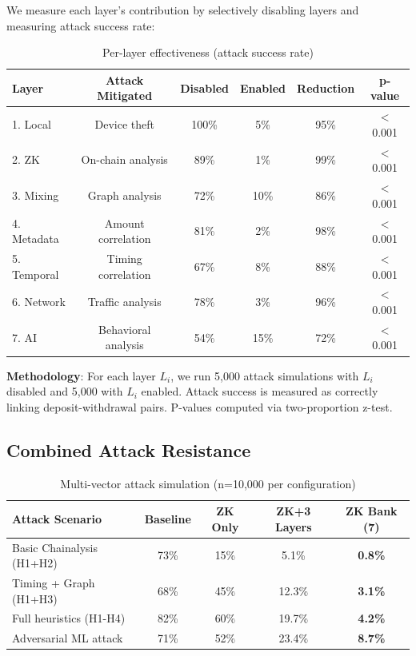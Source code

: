 \documentclass[11pt]{article}
\theoremstyle{definition}
\theoremstyle{plain}
\theoremstyle{remark}
\begin{document}
We measure each layer's contribution by selectively disabling layers and measuring attack success rate:

\begin{table}[H]
\centering
\caption{Per-layer effectiveness (attack success rate)}
\label{tab:layers}
\begin{tabular}{lccccc}
\toprule
\textbf{Layer} & \textbf{Attack Mitigated} & \textbf{Disabled} & \textbf{Enabled} & \textbf{Reduction} & \textbf{p-value} \\
\midrule
1. Local & Device theft & 100\% & 5\% & 95\% & $<$0.001 \\
2. ZK & On-chain analysis & 89\% & 1\% & 99\% & $<$0.001 \\
3. Mixing & Graph analysis & 72\% & 10\% & 86\% & $<$0.001 \\
4. Metadata & Amount correlation & 81\% & 2\% & 98\% & $<$0.001 \\
5. Temporal & Timing correlation & 67\% & 8\% & 88\% & $<$0.001 \\
6. Network & Traffic analysis & 78\% & 3\% & 96\% & $<$0.001 \\
7. AI & Behavioral analysis & 54\% & 15\% & 72\% & $<$0.001 \\
\bottomrule
\end{tabular}
\end{table}

\textbf{Methodology}: For each layer $L_i$, we run 5,000 attack simulations with $L_i$ disabled and 5,000 with $L_i$ enabled. Attack success is measured as correctly linking deposit-withdrawal pairs. P-values computed via two-proportion z-test.

\subsection{Combined Attack Resistance}

\begin{table}[H]
\centering
\caption{Multi-vector attack simulation (n=10,000 per configuration)}
\label{tab:combined}
\begin{tabular}{lcccc}
\toprule
\textbf{Attack Scenario} & \textbf{Baseline} & \textbf{ZK Only} & \textbf{ZK+3 Layers} & \textbf{ZK Bank (7)} \\
\midrule
Basic Chainalysis (H1+H2) & 73\% & 15\% & 5.1\% & \textbf{0.8\%} \\
Timing + Graph (H1+H3) & 68\% & 45\% & 12.3\% & \textbf{3.1\%} \\
Full heuristics (H1-H4) & 82\% & 60\% & 19.7\% & \textbf{4.2\%} \\
Adversarial ML attack & 71\% & 52\% & 23.4\% & \textbf{8.7\%} \\
\bottomrule
\end{tabular}
\end{table}
\end{document}
